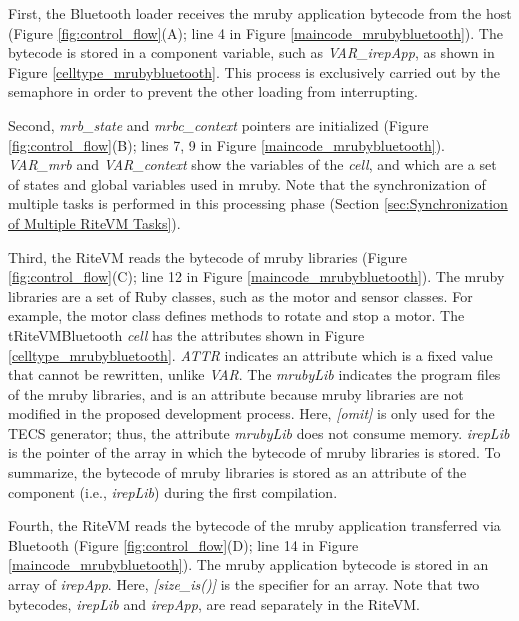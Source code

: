 \documentclass[conference]{IEEEtran/IEEEtran/IEEEtran}
\begin{document}
First, the Bluetooth loader receives the mruby application bytecode from the host (Figure \ref{fig:control_flow}(A); line 4 in Figure \ref{maincode_mrubybluetooth}).
The bytecode is stored in a component variable, such as {\it VAR\_irepApp}, as shown in Figure \ref{celltype_mrubybluetooth}.
This process is exclusively carried out by the semaphore in order to prevent the other loading from interrupting.

Second, {\it mrb\_state} and {\it mrbc\_context} pointers are initialized (Figure \ref{fig:control_flow}(B); lines 7, 9 in Figure \ref{maincode_mrubybluetooth}).
{\it VAR\_mrb} and {\it VAR\_context} show the variables of the {\it cell}, and which are a set of states and global variables used in mruby.
Note that the synchronization of multiple tasks is performed in this processing phase (Section \ref{sec:Synchronization of Multiple RiteVM Tasks}).

Third, the RiteVM reads the bytecode of mruby libraries (Figure \ref{fig:control_flow}(C); line 12 in Figure \ref{maincode_mrubybluetooth}).
The mruby libraries are a set of Ruby classes, such as the motor and sensor classes.
For example, the motor class defines methods to rotate and stop a motor.
The tRiteVMBluetooth {\it cell} has the attributes shown in Figure \ref{celltype_mrubybluetooth}.
{\it ATTR} indicates an attribute which is a fixed value that cannot be rewritten, unlike {\it VAR}.
The {\it mrubyLib} indicates the program files of the mruby libraries, and is an attribute because mruby libraries are not modified in the proposed development process.
Here, {\it [omit]} is only used for the TECS generator; thus, the attribute {\it mrubyLib} does not consume memory.
{\it irepLib} is the pointer of the array in which the bytecode of mruby libraries is stored.
To summarize, the bytecode of mruby libraries is stored as an attribute of the component (i.e., {\it irepLib}) during the first compilation.

Fourth, the RiteVM reads the bytecode of the mruby application transferred via Bluetooth (Figure \ref{fig:control_flow}(D); line 14 in Figure \ref{maincode_mrubybluetooth}).
The mruby application bytecode is stored in an array of {\it irepApp}.
Here, {\it [size\_is()]} is the specifier for an array.
Note that two bytecodes, {\it irepLib} and {\it irepApp}, are read separately in the RiteVM.
\end{document}
